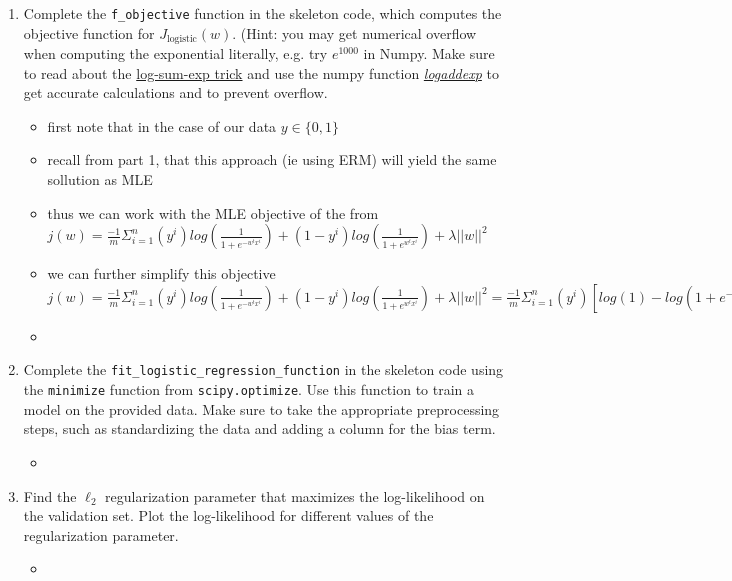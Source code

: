 \documentclass{article}
\theoremstyle{plain}
\theoremstyle{definition}
\begin{document}
\begin{enumerate}
\item Complete the \texttt{f\_objective} function in the skeleton code,
which computes the objective function for $J_{\text{logistic}}(w)$.
(Hint: you may get numerical overflow when computing the exponential literally,
e.g. try $e^{1000}$ in Numpy.
Make sure to read about the
\href{https://blog.feedly.com/tricks-of-the-trade-logsumexp/}{log-sum-exp trick}
and use the numpy function
\textit{ \href{https://docs.scipy.org/doc/numpy/reference/generated/numpy.logaddexp.html}{logaddexp}
}
to get accurate calculations
and to prevent overflow.

\begin{itemize}
    \color{blue}
    \item first note that in the case of our data $y\in \{0,1\}$
    \item recall from part 1, that this approach (ie using ERM) will yield the same sollution as MLE 
    \item thus we can work with the MLE objective of the from $j(w)=\frac{-1}{m}\Sigma_{i=1}^{n}(y^i)log(\frac{1}{1+e^{-w^tx^i}})+(1-y^i)log(\frac{1}{1+e^{w^tx^i}})+\lambda ||w||^2$
    \item we can further simplify this objective$j(w)=\frac{-1}{m}\Sigma_{i=1}^{n}(y^i)log(\frac{1}{1+e^{-w^tx^i}})+(1-y^i)log(\frac{1}{1+e^{w^tx^i}})+\lambda ||w||^2=\frac{-1}{m}\Sigma_{i=1}^{n}(y^i)[log({1})-log({1+e^{-w^tx^i}})]+(1-y^i)[log(1)-log({1+e^{w^tx^i}}))+\lambda ||w||^2=\Sigma_{i=1}^{n}\lambda ||w||^2-(y^i)[log({1+e^{-w^tx^i}})]-(1-y^i)[log({1+e^{w^tx^i}})])=\Sigma_{i=1}^{n}\lambda ||w||^2-(y^i)[log({e^{0}+e^{-w^tx^i}})]-(1-y^i)[log({e^{0}+e^{w^tx^i}})])$
      \item \inputminted[firstline=17, lastline=32, breaklines=True]{python}{hw_4_code.py}
\end{itemize}

\item Complete the \texttt{fit\_logistic\_regression\_function} in the skeleton
code using the \texttt{minimize} function from \texttt{scipy.optimize}.
Use this function to train
a model on the provided data. Make sure to take the appropriate preprocessing
steps, such as standardizing the data and adding a column for the
bias term. 
\begin{itemize}
    \
\item \inputminted[firstline=34, lastline=91, breaklines=True]{python}{hw_4_code.py}

\end{itemize}
\item Find the $\ell_{2}$ regularization parameter that maximizes the log-likelihood
on the validation set. Plot the log-likelihood for different values
of the regularization parameter. 
\begin{itemize}
    \item 


\end{itemize}
\end{enumerate}
\end{document}
